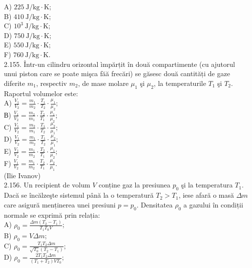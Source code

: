 \documentclass[10pt]{article}
\begin{document}
A) $225 \mathrm{~J} / \mathrm{kg} \cdot \mathrm{K}$;\\
B) $410 \mathrm{~J} / \mathrm{kg} \cdot \mathrm{K}$;\\
C) $10^{3} \mathrm{~J} / \mathrm{kg} \cdot \mathrm{K}$;\\
D) $750 \mathrm{~J} / \mathrm{kg} \cdot \mathrm{K}$;\\
E) $550 \mathrm{~J} / \mathrm{kg} \cdot \mathrm{K}$;\\
F) $760 \mathrm{~J} / \mathrm{kg} \cdot \mathrm{K}$.\\
2.155. Într-un cilindru orizontal ìmpărțit în două compartimente (cu ajutorul unui piston care se poate mişca făă frecări) se găsesc două cantități de gaze diferite $m_{1}$, respectiv $m_{2}$, de mase molare $\mu_{1}$ şi $\mu_{2}$, la temperaturile $T_{1}$ şi $T_{2}$. Raportul volumelor este:\\
A) $\frac{V_{1}}{V_{2}}=\frac{m_{1}}{m_{2}} \cdot \frac{T_{1}}{T_{2}} \cdot \frac{\mu_{1}}{\mu_{2}}$;\\
В) $\frac{V_{1}}{V_{2}}=\frac{m_{2}}{m_{1}} \cdot \frac{T_{2}}{T_{1}} \cdot \frac{\mu_{1}}{\mu_{2}}$;\\
C) $\frac{V_{1}}{V_{2}}=\frac{m_{2}}{m_{1}} \cdot \frac{T_{1}}{T_{2}} \cdot \frac{\mu_{2}}{\mu_{1}}$;\\
D) $\frac{V_{1}}{V_{2}}=\frac{m_{1}}{m_{2}} \cdot \frac{T_{1}}{T_{2}} \cdot \frac{\mu_{2}}{\mu_{1}}$;\\
E) $\frac{V_{1}}{V_{2}}=\frac{m_{1}}{m_{2}} \cdot \frac{T_{2}}{T_{1}} \cdot \frac{\mu_{1}}{\mu_{2}}$;\\
F) $\frac{V_{1}}{V_{2}}=\frac{m_{1}}{m_{2}} \cdot \frac{T_{2}}{T_{1}} \cdot \frac{\mu_{2}}{\mu_{1}}$.\\
(Ilie Ivanov)\\
2.156. Un recipient de volum $V$ conține gaz la presiunea $p_{0}$ şi la temperatura $T_{1}$. Dacă se încălzeşte sistemul până la o temperatură $T_{2}>T_{1}$, iese afară o masă $\Delta m$ care asigură menținerea unei presiuni $p=p_{0}$. Densitatea $\rho_{0}$ a gazului în condiții normale se exprimă prin relația:\\
A) $\rho_{0}=\frac{\Delta m\left(T_{2}-T_{1}\right)}{T_{1} T_{0} V}$;\\
B) $\rho_{0}=V \Delta m$;\\
C) $\rho_{0}=\frac{T_{1} T_{2} \Delta m}{\sqrt{T_{0}}\left(T_{2}-T_{1}\right)}$;\\
D) $\rho_{0}=\frac{2 T_{1} T_{2} \Delta m}{\left(T_{1}+T_{2}\right) V T_{0}}$;\\
\end{document}
